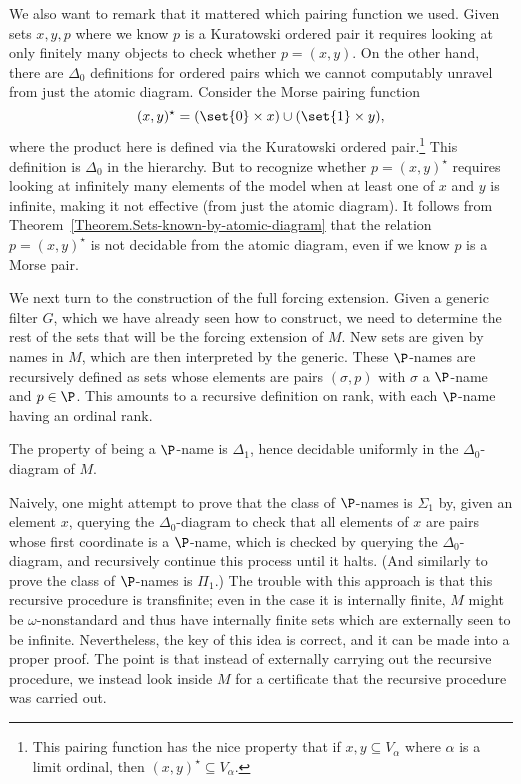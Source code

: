 \documentclass{amsart}
\begin{document}
 We also want to remark that it mattered which pairing function we used. Given sets $x,y,p$ where we know $p$ is a Kuratowski ordered pair it requires looking at only finitely many objects to check whether $p = (x,y)$. On the other hand, there are $\Delta_0$ definitions for ordered pairs which we cannot computably unravel from just the atomic diagram. Consider the Morse pairing function
 $$(x,y)^\star = (\set{0} \times x) \cup (\set{1} \times y),$$
 where the product here is defined via the Kuratowski ordered pair.\footnote{This pairing function has the nice property that if $x,y \subseteq V_\alpha$ where $\alpha$ is a limit ordinal, then $(x,y)^\star \subseteq V_\alpha$.}
 This definition is $\Delta_0$ in the \Levy{} hierarchy. But to recognize whether $p = (x,y)^\star$ requires looking at infinitely many elements of the model when at least one of $x$ and $y$ is infinite, making it not effective (from just the atomic diagram). It follows from Theorem~\ref{Theorem.Sets-known-by-atomic-diagram} that the relation $p = (x,y)^\star$ is not decidable from the atomic diagram, even if we know $p$ is a Morse pair.
 \smallskip
 
 We next turn to the construction of the full forcing extension.
 Given a generic filter $G$, which we have already seen how to construct, we need to determine the rest of the sets that will be the forcing extension of $M$. New sets are given by names in $M$, which are then interpreted by the generic.
 These $\P$-names are recursively defined as sets whose elements are pairs $(\sigma,p)$ with $\sigma$ a $\P$-name and $p \in \P$. This amounts to a recursive definition on rank, with each $\P$-name having an ordinal rank.
 
 \begin{lemma}
 \label{lemma:Pnames}
 The property of being a $\P$-name is $\Delta_1$, hence decidable uniformly in the $\Delta_0$-diagram of $M$.
 \end{lemma}
 
 Naively, one might attempt to prove that the class of $\P$-names is $\Sigma_1$ by, given an element $x$, querying the $\Delta_0$-diagram to check that all elements of $x$ are pairs whose first coordinate is a $\P$-name, which is checked by querying the $\Delta_0$-diagram, and recursively continue this process until it halts. (And similarly to prove the class of $\P$-names is $\Pi_1$.) The trouble with this approach is that this recursive procedure is transfinite; even in the case it is internally finite, $M$ might be $\omega$-nonstandard and thus have internally finite sets which are externally seen to be infinite. Nevertheless, the key of this idea is correct, and it can be made into a proper proof. The point is that instead of externally carrying out the recursive procedure, we instead look inside $M$ for a certificate that the recursive procedure was carried out.
 
\end{document}
